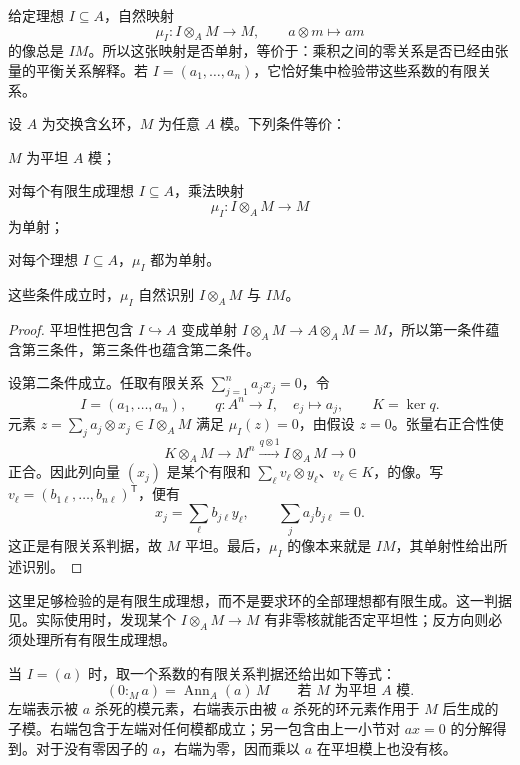 给定理想 \(I\subseteq A\)，自然映射
\[
	\mu_I:I\otimes_A M\longrightarrow M,\qquad
	a\otimes m\longmapsto am
\]
的像总是 \(IM\)。所以这张映射是否单射，等价于：乘积之间的零关系是否已经由张量的平衡关系解释。若 \(I=(a_1,\ldots,a_n)\)，它恰好集中检验带这些系数的有限关系。

\begin{theorem}\label{g5:thm:flat-ideal-criterion}
	设 \(A\) 为交换含幺环，\(M\) 为任意 \(A\) 模。下列条件等价：
	\begin{equivalences}
		\item \(M\) 为平坦 \(A\) 模；
		\item 对每个有限生成理想 \(I\subseteq A\)，乘法映射
		\[
			\mu_I:I\otimes_A M\longrightarrow M
		\]
		为单射；
		\item 对每个理想 \(I\subseteq A\)，\(\mu_I\) 都为单射。
	\end{equivalences}
	这些条件成立时，\(\mu_I\) 自然识别 \(I\otimes_A M\) 与 \(IM\)。
\end{theorem}
\begin{proof}
	平坦性把包含 \(I\hookrightarrow A\) 变成单射
	\(I\otimes_A M\to A\otimes_A M=M\)，所以第一条件蕴含第三条件，第三条件也蕴含第二条件。

	设第二条件成立。任取有限关系 \(\sum_{j=1}^n a_jx_j=0\)，令
	\[
		I=(a_1,\ldots,a_n),\qquad
		q:A^n\longrightarrow I,\quad e_j\longmapsto a_j,\qquad
		K=\ker q.
	\]
	元素 \(z=\sum_j a_j\otimes x_j\in I\otimes_A M\) 满足 \(\mu_I(z)=0\)，由假设 \(z=0\)。张量右正合性使
	\[
		K\otimes_A M\longrightarrow M^n
		\xrightarrow{q\otimes1} I\otimes_A M\longrightarrow0
	\]
	正合。因此列向量 \((x_j)\) 是某个有限和
	\(\sum_\ell v_\ell\otimes y_\ell\)、\(v_\ell\in K\)，的像。写
	\(v_\ell=(b_{1\ell},\ldots,b_{n\ell})^{\mathsf T}\)，便有
	\[
		x_j=\sum_\ell b_{j\ell}y_\ell,\qquad
		\sum_j a_jb_{j\ell}=0.
	\]
	这正是有限关系判据，故 \(M\) 平坦。最后，\(\mu_I\) 的像本来就是 \(IM\)，其单射性给出所述识别。
\end{proof}

这里足够检验的是有限生成理想，而不是要求环的全部理想都有限生成。这一判据见\cite[第7节，定理7.7，第50--51页]{Matsumura1989}。实际使用时，发现某个 \(I\otimes_A M\to M\) 有非零核就能否定平坦性；反方向则必须处理所有有限生成理想。

\ProseParagraphBreak

当 \(I=(a)\) 时，取一个系数的有限关系判据还给出如下等式：
\begin{equation}\label{g5:eq:flat-annihilator}
	(0:_M a)=\operatorname{Ann}_A(a)\,M
	\qquad\text{若 \(M\) 为平坦 \(A\) 模}.
\end{equation}
左端表示被 \(a\) 杀死的模元素，右端表示由被 \(a\) 杀死的环元素作用于 \(M\) 后生成的子模。右端包含于左端对任何模都成立；另一包含由上一小节对 \(ax=0\) 的分解得到。对于没有零因子的 \(a\)，右端为零，因而乘以 \(a\) 在平坦模上也没有核。


